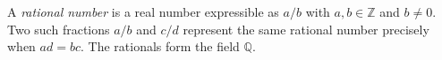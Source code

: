 
A \emph{rational number} is a real number expressible as $a/b$ with $a,b\in\mathbb Z$ and $b\ne0$. Two such fractions $a/b$ and $c/d$ represent the same rational number precisely when $ad=bc$. The rationals form the field $\mathbb Q$.
